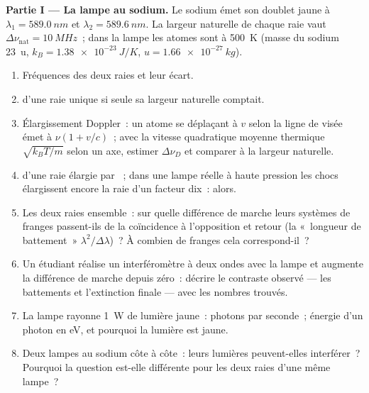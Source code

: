 \begin{problem}
\medskip
\noindent\textbf{Partie I --- La lampe au sodium.}
Le sodium émet son doublet jaune à $\lambda_1 = \qty{589.0}{nm}$ et $\lambda_2 =
\qty{589.6}{nm}$. La largeur naturelle de chaque raie vaut $\Delta\nu_{\text{nat}} =
\qty{10}{MHz}$~; dans la lampe les atomes sont à \qty{500}{K} (masse du sodium
\qty{23}{u}, $k_B = \qty{1.38e-23}{J/K}$, $u = \qty{1.66e-27}{kg}$).
\begin{enumerate}
  \item Fréquences des deux raies et leur écart.
  \item {} d'une raie unique si seule sa largeur naturelle
        comptait.
  \item Élargissement Doppler~: un atome se déplaçant à $v$ selon la ligne de
        visée émet à $\nu(1 + v/c)$~; avec la vitesse quadratique moyenne thermique $\sqrt{k_BT
        /m}$ selon un axe, estimer $\Delta\nu_D$ et comparer à la
        largeur naturelle.
  \item {} d'une raie élargie par ~; dans une lampe
        réelle à haute pression les chocs élargissent encore la raie d'un facteur
        dix~:  alors.
  \item Les deux raies ensemble~: sur quelle différence de marche leurs
        systèmes de franges passent-ils de la coïncidence à l'opposition et retour
        (la «~longueur de battement~» $\lambda^2/\Delta\lambda$)~? À combien de franges cela correspond-il~?
  \item Un étudiant réalise un interféromètre à deux ondes avec la lampe et
        augmente la différence de marche depuis zéro~: décrire le
        contraste observé --- les battements et l'extinction finale --- avec
        les nombres trouvés.
  \item La lampe rayonne \qty{1}{W} de lumière jaune~: photons par seconde~;
        énergie d'un photon en eV, et pourquoi la lumière est jaune.
  \item Deux lampes au sodium côte à côte~: leurs lumières peuvent-elles interférer~?
        Pourquoi la question est-elle différente pour les deux raies d'une même lampe~?
\end{enumerate}


\end{problem}
